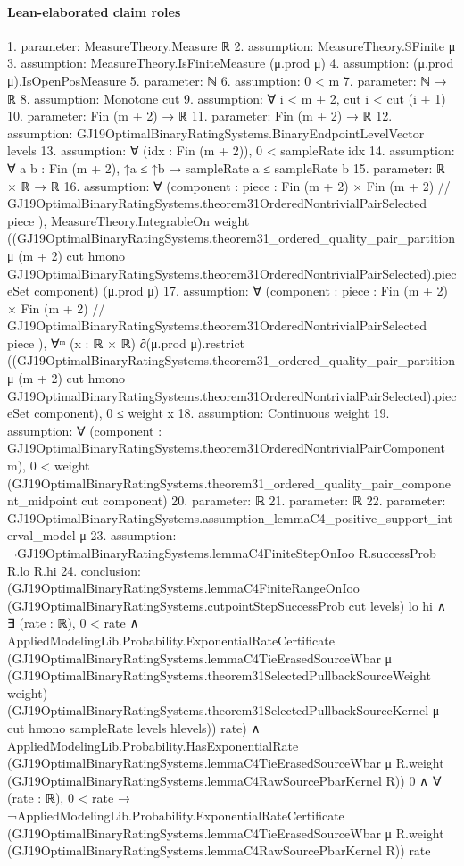\documentclass[10pt]{article}
\begin{document}
\paragraph{Lean-elaborated claim roles}\begin{ReviewVerbatim}
1. parameter: MeasureTheory.Measure ℝ
2. assumption: MeasureTheory.SFinite μ
3. assumption: MeasureTheory.IsFiniteMeasure (μ.prod μ)
4. assumption: (μ.prod μ).IsOpenPosMeasure
5. parameter: ℕ
6. assumption: 0 < m
7. parameter: ℕ → ℝ
8. assumption: Monotone cut
9. assumption: ∀ i < m + 2, cut i < cut (i + 1)
10. parameter: Fin (m + 2) → ℝ
11. parameter: Fin (m + 2) → ℝ
12. assumption: GJ19OptimalBinaryRatingSystems.BinaryEndpointLevelVector levels
13. assumption: ∀ (idx : Fin (m + 2)), 0 < sampleRate idx
14. assumption: ∀ {a b : Fin (m + 2)}, ↑a ≤ ↑b → sampleRate a ≤ sampleRate b
15. parameter: ℝ × ℝ → ℝ
16. assumption: ∀
  (component :
    { piece : Fin (m + 2) × Fin (m + 2) //
      GJ19OptimalBinaryRatingSystems.theorem31OrderedNontrivialPairSelected piece }),
  MeasureTheory.IntegrableOn weight
    ((GJ19OptimalBinaryRatingSystems.theorem31_ordered_quality_pair_partition μ (m + 2) cut hmono
          GJ19OptimalBinaryRatingSystems.theorem31OrderedNontrivialPairSelected).pieceSet
      component)
    (μ.prod μ)
17. assumption: ∀
  (component :
    { piece : Fin (m + 2) × Fin (m + 2) //
      GJ19OptimalBinaryRatingSystems.theorem31OrderedNontrivialPairSelected piece }),
  ∀ᵐ (x :
    ℝ ×
      ℝ) ∂(μ.prod μ).restrict
      ((GJ19OptimalBinaryRatingSystems.theorem31_ordered_quality_pair_partition μ (m + 2) cut hmono
            GJ19OptimalBinaryRatingSystems.theorem31OrderedNontrivialPairSelected).pieceSet
        component),
    0 ≤ weight x
18. assumption: Continuous weight
19. assumption: ∀ (component : GJ19OptimalBinaryRatingSystems.theorem31OrderedNontrivialPairComponent m),
  0 < weight (GJ19OptimalBinaryRatingSystems.theorem31_ordered_quality_pair_component_midpoint cut component)
20. parameter: ℝ
21. parameter: ℝ
22. parameter: GJ19OptimalBinaryRatingSystems.assumption_lemmaC4_positive_support_interval_model μ
23. assumption: ¬GJ19OptimalBinaryRatingSystems.lemmaC4FiniteStepOnIoo R.successProb R.lo R.hi
24. conclusion: (GJ19OptimalBinaryRatingSystems.lemmaC4FiniteRangeOnIoo
      (GJ19OptimalBinaryRatingSystems.cutpointStepSuccessProb cut levels) lo hi ∧
    ∃ (rate : ℝ),
      0 < rate ∧
        AppliedModelingLib.Probability.ExponentialRateCertificate
          (GJ19OptimalBinaryRatingSystems.lemmaC4TieErasedSourceWbar μ
            (GJ19OptimalBinaryRatingSystems.theorem31SelectedPullbackSourceWeight weight)
            (GJ19OptimalBinaryRatingSystems.theorem31SelectedPullbackSourceKernel μ cut hmono sampleRate levels
              hlevels))
          rate) ∧
  AppliedModelingLib.Probability.HasExponentialRate
      (GJ19OptimalBinaryRatingSystems.lemmaC4TieErasedSourceWbar μ R.weight
        (GJ19OptimalBinaryRatingSystems.lemmaC4RawSourcePbarKernel R))
      0 ∧
    ∀ (rate : ℝ),
      0 < rate →
        ¬AppliedModelingLib.Probability.ExponentialRateCertificate
            (GJ19OptimalBinaryRatingSystems.lemmaC4TieErasedSourceWbar μ R.weight
              (GJ19OptimalBinaryRatingSystems.lemmaC4RawSourcePbarKernel R))
            rate
\end{ReviewVerbatim}
\end{document}
